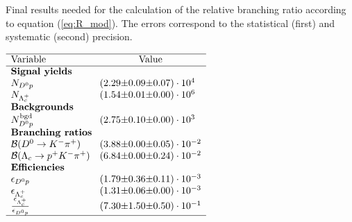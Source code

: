  
\begin{table}[h]
    \centering
    \caption{Final results needed for the calculation of the relative branching ratio \R according to equation (\ref{eq:R_mod}). The errors correspond to the statistical (first) and systematic (second) precision.}
    \label{tab:table_finalresults}
    $\begin{array}{lr@{\pm}r@{\pm}l}
    \hline
    \text{Variable} & \multicolumn{3}{c}{\text{Value}} \\
    \hline
\multicolumn{4}{l}{\text{\textbf{Signal yields}}} \\
\NDp&(2.29 & 0.09 & 0.07) \cdot 10^{4}\\
\NLc&(1.54 & 0.01 & 0.00) \cdot 10^{6}\\
\multicolumn{4}{l}{\text{\textbf{Backgrounds}}} \\
\NBgdDp&(2.75 & 0.10 & 0.00) \cdot 10^{3}\\
\multicolumn{4}{l}{\text{\textbf{Branching ratios}}} \\
\DBFDp&(3.88 & 0.00 & 0.05) \cdot 10^{-2}\\
\DBFLc&(6.84 & 0.00 & 0.24) \cdot 10^{-2}\\
\multicolumn{4}{l}{\text{\textbf{Efficiencies}}} \\
\effDp&(1.79 & 0.36 & 0.11) \cdot 10^{-3}\\
\effLc&(1.31 & 0.06 & 0.00) \cdot 10^{-3}\\
\frac{\effLc}{\effDp}&(7.30 & 1.50 & 0.50) \cdot 10^{-1}\\

    \hline
    \end{array}$
\end{table}
